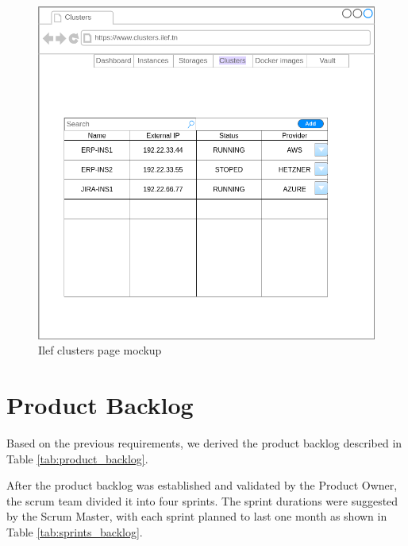 \begin{figure}[h]
  \center
  \includegraphics[width=13cm]{./chapters/preliminary_study/mockup-clusters.png}
  \caption{Ilef clusters page mockup}
  \label{fig:mockup-clusters}
\end{figure}

\vspace*{3cm}
\section{Product Backlog}

Based on the previous requirements, we derived the product backlog described in Table \ref{tab:product_backlog}.

After the product backlog was established and validated by the Product Owner, the scrum team divided it into four sprints. The sprint durations were suggested by the Scrum Master, with each sprint planned to last one month as shown in Table \ref{tab:sprints_backlog}.

